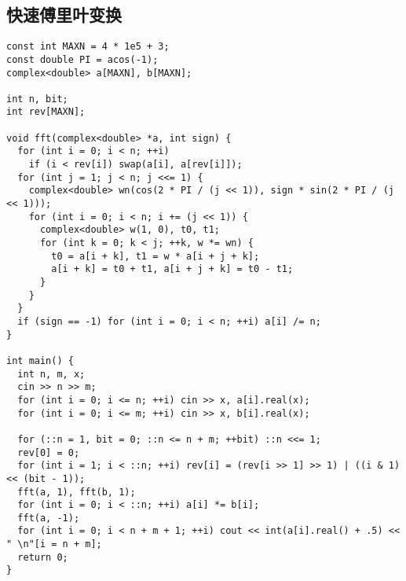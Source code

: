 \subsection{快速傅里叶变换}
\begin{lstlisting}
const int MAXN = 4 * 1e5 + 3;
const double PI = acos(-1);
complex<double> a[MAXN], b[MAXN];

int n, bit;
int rev[MAXN];

void fft(complex<double> *a, int sign) {
  for (int i = 0; i < n; ++i)
    if (i < rev[i]) swap(a[i], a[rev[i]]);
  for (int j = 1; j < n; j <<= 1) {
    complex<double> wn(cos(2 * PI / (j << 1)), sign * sin(2 * PI / (j << 1)));
    for (int i = 0; i < n; i += (j << 1)) {
      complex<double> w(1, 0), t0, t1;
      for (int k = 0; k < j; ++k, w *= wn) {
        t0 = a[i + k], t1 = w * a[i + j + k];
        a[i + k] = t0 + t1, a[i + j + k] = t0 - t1;
      }
    }
  }
  if (sign == -1) for (int i = 0; i < n; ++i) a[i] /= n;
}

int main() {
  int n, m, x;
  cin >> n >> m;
  for (int i = 0; i <= n; ++i) cin >> x, a[i].real(x);
  for (int i = 0; i <= m; ++i) cin >> x, b[i].real(x);

  for (::n = 1, bit = 0; ::n <= n + m; ++bit) ::n <<= 1;
  rev[0] = 0;
  for (int i = 1; i < ::n; ++i) rev[i] = (rev[i >> 1] >> 1) | ((i & 1) << (bit - 1));
  fft(a, 1), fft(b, 1);
  for (int i = 0; i < ::n; ++i) a[i] *= b[i];
  fft(a, -1);
  for (int i = 0; i < n + m + 1; ++i) cout << int(a[i].real() + .5) << " \n"[i = n + m];
  return 0;
}
\end{lstlisting}

